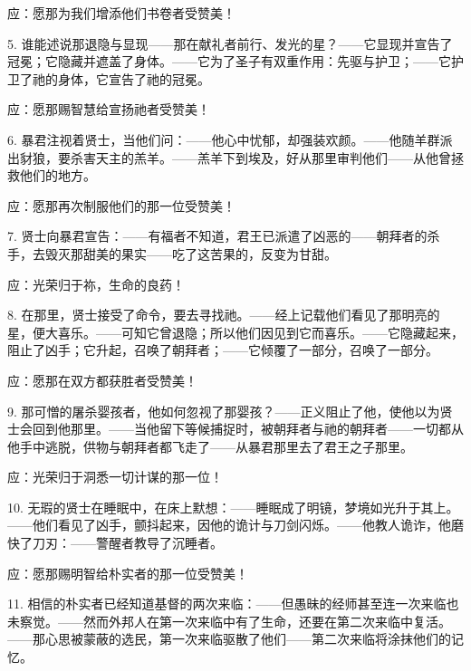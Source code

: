 应：愿那为我们增添他们书卷者受赞美！\par

5. 谁能述说那退隐与显现——那在献礼者前行、发光的星？——它显现并宣告了冠冕；它隐藏并遮盖了身体。——它为了圣子有双重作用：先驱与护卫；——它护卫了祂的身体，它宣告了祂的冠冕。\par

应：愿那赐智慧给宣扬祂者受赞美！\par

6. 暴君注视着贤士，当他们问：——他心中忧郁，却强装欢颜。——他随羊群派出豺狼，要杀害天主的羔羊。——羔羊下到埃及，好从那里审判他们——从他曾拯救他们的地方。\par

应：愿那再次制服他们的那一位受赞美！\par

7. 贤士向暴君宣告：——有福者不知道，君王已派遣了凶恶的——朝拜者的杀手，去毁灭那甜美的果实——吃了这苦果的，反变为甘甜。\par

应：光荣归于祢，生命的良药！\par

8. 在那里，贤士接受了命令，要去寻找祂。——经上记载他们看见了那明亮的星，便大喜乐。——可知它曾退隐；所以他们因见到它而喜乐。——它隐藏起来，阻止了凶手；它升起，召唤了朝拜者；——它倾覆了一部分，召唤了一部分。\par

应：愿那在双方都获胜者受赞美！\par

9. 那可憎的屠杀婴孩者，他如何忽视了那婴孩？——正义阻止了他，使他以为贤士会回到他那里。——当他留下等候捕捉时，被朝拜者与祂的朝拜者——一切都从他手中逃脱，供物与朝拜者都飞走了——从暴君那里去了君王之子那里。\par

应：光荣归于洞悉一切计谋的那一位！\par

10. 无瑕的贤士在睡眠中，在床上默想：——睡眠成了明镜，梦境如光升于其上。——他们看见了凶手，颤抖起来，因他的诡计与刀剑闪烁。——他教人诡诈，他磨快了刀刃：——警醒者教导了沉睡者。\par

应：愿那赐明智给朴实者的那一位受赞美！\par

11. 相信的朴实者已经知道基督的两次来临：——但愚昧的经师甚至连一次来临也未察觉。——然而外邦人在第一次来临中有了生命，还要在第二次来临中复活。——那心思被蒙蔽的选民，第一次来临驱散了他们——第二次来临将涂抹他们的记忆。\par

